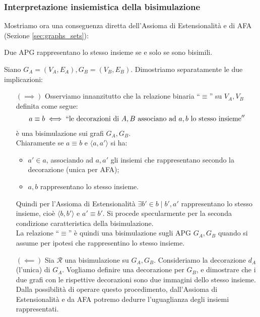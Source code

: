 \subsubsection{Interpretazione insiemistica della bisimulazione}
Mostriamo ora una conseguenza diretta dell'Assioma di Estensionalità e di AFA (Sezione \ref{sec:graphs_sets}):
\begin{theorem}
    Due APG rappresentano lo stesso insieme se e solo se sono bisimili.
    \label{theo:bisi_iff_eqsets}
\end{theorem}
\begin{proof2}
    Siano $G_A = (V_A, E_A), G_B = (V_B, E_B)$. Dimostriamo separatamente le due implicazioni:
    \begin{enumerate}
        \item[$(\implies)$] Osserviamo innanzitutto che la relazione binaria ``$\equiv$'' su $V_A, V_B$ definita come segue:
              \begin{gather*}
                  a \equiv b \iff ``\text{le decorazioni di } A,B \text{ associano ad } a,b \text{ lo stesso insieme}''
              \end{gather*}
              è una bisimulazione sui grafi $G_A, G_B$.\\
              Chiaramente se $a \equiv b$ e $\langle a, a' \rangle$ si ha:
              \begin{itemize}
                  \item $a' \in a$, associando ad $a,a'$ gli insiemi che rappresentano secondo la decorazione (unica per AFA);
                  \item $a,b$ rappresentano lo stesso insieme.
              \end{itemize}
              Quindi per l'Assioma di Estensionalità $\exists b' \in b\mid b',a'$ rappresentano lo stesso insieme, cioè $\langle b, b' \rangle$ e $a' \equiv b'$. Si procede specularmente per la seconda condizione caratteristica della bisimulazione.\\
              La relazione ``$\equiv$'' è quindi una bisimulazione sugli APG $G_A,G_B$ quando si assume per ipotesi che rappresentino lo stesso insieme.
        \item[$(\impliedby)$] Sia $\mathcal{R}$ una bisimulazione su $G_A,G_B$. Consideriamo la decorazione $d_A$ (l'unica) di $G_A$. Vogliamo definire una decorazione per $G_B$, e dimostrare che i due grafi con le rispettive decorazioni sono due immagini dello stesso insieme. Dalla possibilità di operare questo procedimento, dall'Assioma di Estensionalità e da AFA potremo dedurre l'uguaglianza degli insiemi rappresentati.\\

\end{enumerate}
\end{proof2}
